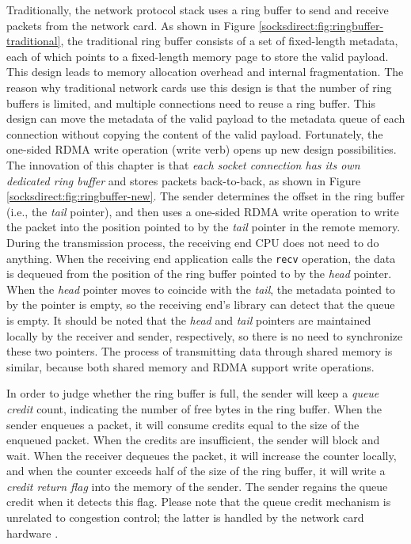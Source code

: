 Traditionally, the network protocol stack uses a ring buffer to send and receive packets from the network card.
As shown in Figure \ref {socksdirect:fig:ringbuffer-traditional}, the traditional ring buffer consists of a set of fixed-length metadata, each of which points to a fixed-length memory page to store the valid payload. This design leads to memory allocation overhead and internal fragmentation.
The reason why traditional network cards use this design is that the number of ring buffers is limited, and multiple connections need to reuse a ring buffer. This design can move the metadata of the valid payload to the metadata queue of each connection without copying the content of the valid payload.
Fortunately, the one-sided RDMA write operation (write verb) opens up new design possibilities.
The innovation of this chapter is that \emph {each socket connection has its own dedicated ring buffer} and stores packets back-to-back, as shown in Figure \ref {socksdirect:fig:ringbuffer-new}.
The sender determines the offset in the ring buffer (i.e., the \emph{tail} pointer), and then uses a one-sided RDMA write operation to write the packet into the position pointed to by the \emph{tail} pointer in the remote memory.
During the transmission process, the receiving end CPU does not need to do anything.
When the receiving end application calls the \texttt {recv} operation, the data is dequeued from the position of the ring buffer pointed to by the \emph {head} pointer.
When the \emph{head} pointer moves to coincide with the \emph{tail}, the metadata pointed to by the pointer is empty, so the receiving end's \libipc{} library can detect that the queue is empty.
It should be noted that the \emph{head} and \emph{tail} pointers are maintained locally by the receiver and sender, respectively, so there is no need to synchronize these two pointers.
The process of transmitting data through shared memory is similar, because both shared memory and RDMA support write operations.



In order to judge whether the ring buffer is full, the sender will keep a \textit {queue credit} count, indicating the number of free bytes in the ring buffer.
When the sender enqueues a packet, it will consume credits equal to the size of the enqueued packet.
When the credits are insufficient, the sender will block and wait.
When the receiver dequeues the packet, it will increase the counter locally, and when the counter exceeds half of the size of the ring buffer, it will write a \textit {credit return flag} into the memory of the sender. The sender regains the queue credit when it detects this flag.
Please note that the queue credit mechanism is unrelated to congestion control; the latter is handled by the network card hardware \cite {zhu2015congestion}.

